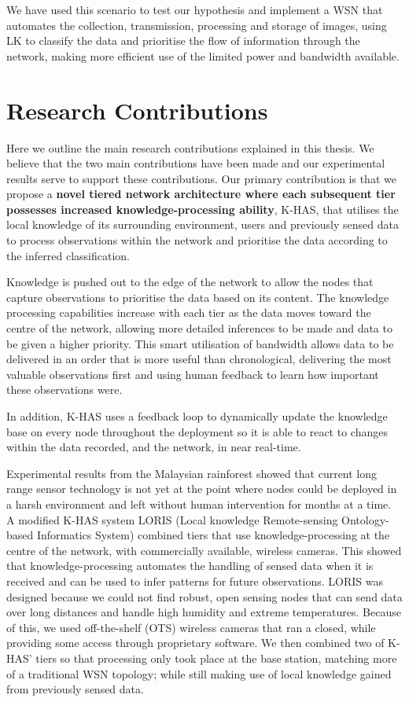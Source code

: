 We have used this scenario to test our hypothesis and implement a WSN that automates the collection, transmission, processing and storage of images, using LK to classify the data and prioritise the flow of information through the network, making more efficient use of the limited power and bandwidth available. 

\section{Research Contributions}

Here we outline the main research contributions explained in this thesis. We believe that the two main contributions have been made and our experimental results serve to support these contributions.
Our primary contribution is that we propose a \textbf{novel tiered network architecture where each subsequent tier possesses increased knowledge-processing ability}, K-HAS, that utilises the local knowledge of its surrounding environment, users and previously sensed data to process observations within the network and prioritise the data according to the inferred classification. 

Knowledge is pushed out to the edge of the network to allow the nodes that capture observations to prioritise the data based on its content. The knowledge processing capabilities increase with each tier as the data moves toward the centre of the network, allowing more detailed inferences to be made and data to be given a higher priority. This smart utilisation of bandwidth allows data to be delivered in an order that is more useful than chronological, delivering the most valuable observations first and using human feedback to learn how important these observations were. 

In addition, K-HAS uses a feedback loop to dynamically update the knowledge base on every node throughout the deployment so it is able to react to changes within the data recorded, and the network, in near real-time.

Experimental results from the Malaysian rainforest showed that current long range sensor technology is not yet at the point where nodes could be deployed in a harsh environment and left without human intervention for months at a time. A modified K-HAS system LORIS (Local knowledge Remote-sensing Ontology-based Informatics System) combined tiers that use knowledge-processing at the centre of the network, with commercially available, wireless cameras. This showed that knowledge-processing automates the handling of sensed data when it is received and can be used to infer patterns for future observations. LORIS was designed because we could not find robust, open sensing nodes that can send data over long distances and handle high humidity and extreme temperatures. Because of this, we used off-the-shelf (OTS) wireless cameras that ran a closed, while providing some access through proprietary software. We then combined two of K-HAS' tiers so that processing only took place at the base station, matching more of a traditional WSN topology; while still making use of local knowledge gained from previously sensed data.

